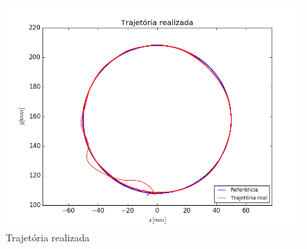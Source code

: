 \documentclass[]{politex}
\begin{document}
\begin{figure}[H]
	\centering
	\includegraphics[scale=0.39]{../../../Experimental/Aquisicoes/CTCx_circulo/xy.png}  
	\caption{Trajetória realizada}
	\label{fig:CTCx_circulo_xy}
\end{figure}
\end{document}
